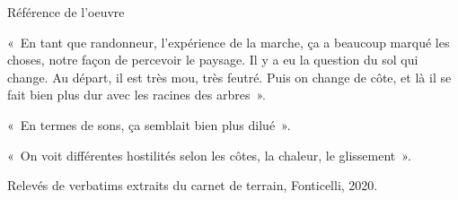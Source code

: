 \documentclass[12pt,twoside,openany]{book}
\newenvironment{lateiDocument}{}{}
\begin{document}
\begin{lateiDocument}
\begin{teiElement}[name={TEI}]
\begin{teiElement}[name={text},xmlid={text-001}]
\begin{teiElement}[name={body},xmlid={body-001}]
\begin{teiDiv}[type={section1},xmlid={section1-009}]
\begin{teiElement}[name={sp}]
\end{teiElement}
				\begin{teiBibl}[xmlid={bibl-013}]
Référence de l'oeuvre
\end{teiBibl}
			
\end{teiDiv}
			\begin{teiDiv}[type={section1},xmlid={section1-010}]

				\begin{teiElement}[name={floatingText}]

					\begin{teiElement}[name={body},xmlid={body-002}]

						\begin{teiDiv}[type={section1},xmlid={floatingText1div1}]

							\begin{teiDiv}[type={section2},xmlid={floatingText1div2}]

								\begin{teiCit}[xmlid={floatingText1cit1}]

									\begin{teiQuote}
« En tant que randonneur, l’expérience de la marche, ça a beaucoup marqué les
										choses, notre façon de percevoir le paysage. Il y a eu la question du sol qui change. Au
										départ, il est très mou, très feutré. Puis on change de côte, et là il se fait bien plus
										dur avec les racines des arbres ».
\end{teiQuote}
									\begin{teiQuote}
« En termes de sons, ça semblait bien plus dilué ».
\end{teiQuote}
									\begin{teiQuote}
« On voit différentes hostilités selon les côtes, la chaleur, le
										glissement ».
\end{teiQuote}
									\begin{teiBibl}[xmlid={bibl-014}]
Relevés de verbatims extraits du carnet de terrain, Fonticelli, 2020.
\end{teiBibl}
								
\end{teiCit}
							
\end{teiDiv}
							\begin{teiDiv}[type={section2},xmlid={floatingText1div3}]


\end{teiDiv}
\end{teiDiv}
\end{teiElement}
\end{teiElement}
\end{teiDiv}
\end{teiElement}
\end{teiElement}
\end{teiElement}
\end{lateiDocument}
\end{document}
